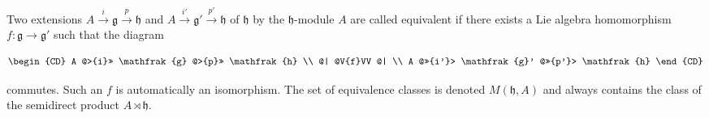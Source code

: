 Two extensions $A \xrightarrow{i} \mathfrak{g} \xrightarrow{p} \mathfrak{h}$ and $A \xrightarrow{i'} \mathfrak{g}' \xrightarrow{p'} \mathfrak{h}$ of $\mathfrak{h}$ by the $\mathfrak{h}$-module $A$ are called equivalent if there exists a Lie algebra homomorphism $f : \mathfrak{g} \to \mathfrak{g}'$ such that the diagram

\[
\begin{CD}
A @>{i}>> \mathfrak{g} @>{p}>> \mathfrak{h} \\
@| @V{f}VV @| \\
A @>>{i'}> \mathfrak{g}' @>>{p'}> \mathfrak{h}
\end{CD}
\]

commutes. Such an $f$ is automatically an isomorphism. The set of equivalence classes is denoted $M(\mathfrak{h}, A)$ and always contains the class of the semidirect product $A \rtimes \mathfrak{h}$.
